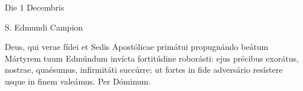 Die 1 Decembris


S. Edmundi Campion



Deus, qui verae fídei et Sedis Apostólicae primátui pro\-pug\-nán\-do
beátum Mártyrem tuum Edmúndum invícta fortitúdine roborásti:
ejus précibus exorátus,
nostrae, quaé\-su\-mus, infirmitáti succúrre;
ut fortes in fide adversário resístere usque in finem valeámus.
Per Dóminum.
